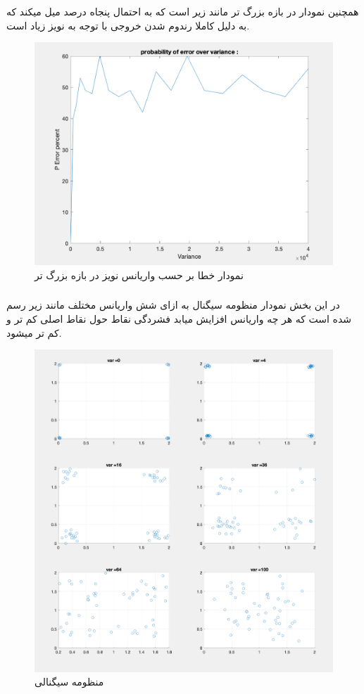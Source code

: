 \documentclass[10pt]{article}
\begin{document}
\newpage
	همچنین نمودار در بازه بزرگ تر مانند زیر است که به احتمال پنجاه درصد میل میکند که به دلیل کاملا رندوم شدن خروجی با توجه به نویز زیاد است.
	\begin{figure}[H]
		\centering
		\includegraphics[width=0.6\linewidth]{../img/3.1.9}
		\caption{نمودار خطا بر حسب واریانس نویز در بازه بزرگ تر}
		\label{fig:3-1-9}
	\end{figure}
	
	\newpage
	\subsubsection{}
	در این بخش نمودار منظومه سیگنال به ازای شش واریانس مختلف مانند زیر رسم شده است که هر چه واریانس افزایش میابد فشردگی نقاط حول نقاط اصلی کم تر و کم تر میشود.
	\begin{figure}[H]
		\centering
		\includegraphics[width=0.8\linewidth]{../img/3.1.11}
		\caption{منظومه سیگنالی}
		\label{fig:3-1-11}
	\end{figure}
\end{document}
